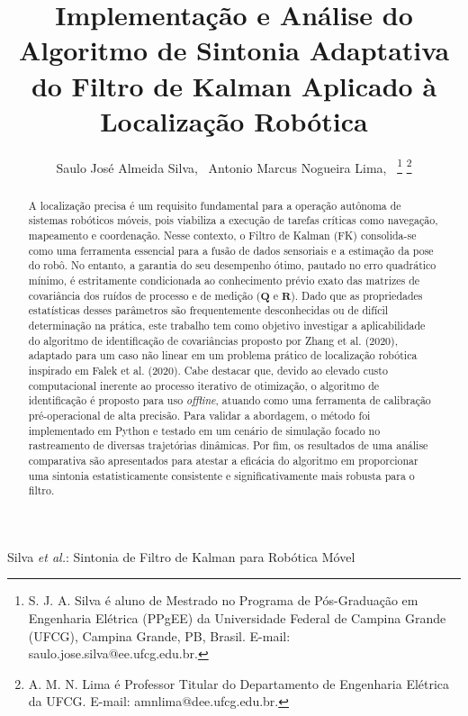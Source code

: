 \documentclass[journal]{IEEEtran}
\begin{document}
    

\title{Implementação e Análise do Algoritmo de Sintonia Adaptativa do Filtro de Kalman Aplicado à Localização Robótica}

\author{Saulo José Almeida Silva,~
        Antonio Marcus Nogueira Lima,~
\thanks{S. J. A. Silva é aluno de Mestrado no Programa de Pós-Graduação em Engenharia Elétrica (PPgEE) da Universidade Federal de Campina Grande (UFCG), Campina Grande, PB, Brasil. E-mail: saulo.jose.silva@ee.ufcg.edu.br.}
\thanks{A. M. N. Lima é Professor Titular do Departamento de Engenharia Elétrica da UFCG. E-mail: amnlima@dee.ufcg.edu.br.}}

%
{Silva \MakeLowercase{\textit{et al.}}: Sintonia de Filtro de Kalman para Robótica Móvel}

\maketitle

\begin{abstract}
A localização precisa é um requisito fundamental para a operação autônoma de sistemas robóticos móveis, pois viabiliza a execução de tarefas críticas como navegação, mapeamento e coordenação. Nesse contexto, o Filtro de Kalman (FK) consolida-se como uma ferramenta essencial para a fusão de dados sensoriais e a estimação da pose do robô. No entanto, a garantia do seu desempenho ótimo, pautado no erro quadrático mínimo, é estritamente condicionada ao conhecimento prévio exato das matrizes de covariância dos ruídos de processo e de medição ($\mathbf{Q}$ e $\mathbf{R}$). Dado que as propriedades estatísticas desses parâmetros são frequentemente desconhecidas ou de difícil determinação na prática, este trabalho tem como objetivo investigar a aplicabilidade do algoritmo de identificação de covariâncias proposto por Zhang et al. (2020), adaptado para um caso não linear em um problema prático de localização robótica inspirado em Falek et al. (2020). Cabe destacar que, devido ao elevado custo computacional inerente ao processo iterativo de otimização, o algoritmo de identificação é proposto para uso \textit{offline}, atuando como uma ferramenta de calibração pré-operacional de alta precisão. Para validar a abordagem, o método foi implementado em Python e testado em um cenário de simulação focado no rastreamento de diversas trajetórias dinâmicas. Por fim, os resultados de uma análise comparativa são apresentados para atestar a eficácia do algoritmo em proporcionar uma sintonia estatisticamente consistente e significativamente mais robusta para o filtro.
\end{abstract}
\end{document}
